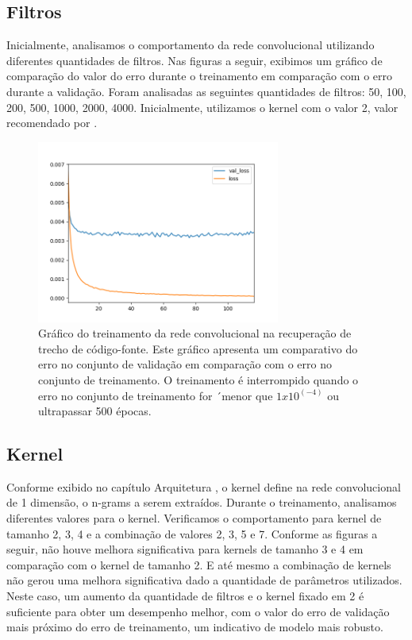 \subsection{Filtros}

Inicialmente, analisamos o comportamento da rede convolucional utilizando diferentes quantidades de filtros. Nas figuras a seguir, exibimos um gráfico de comparação do valor do erro durante o treinamento em comparação com o erro durante a validação. Foram analisadas as seguintes quantidades de filtros: 50, 100, 200, 500, 1000, 2000, 4000. Inicialmente, utilizamos o kernel com o valor 2, valor recomendado por \cite{tan-lstm-qa}.


\begin{figure}[h]
\includegraphics[width=8cm]{figuras/ape-ajustes-hiper-parametros/training-cnn-1000-k-2.png}
\caption{Gráfico do treinamento da rede convolucional na recuperação de trecho de código-fonte. Este gráfico apresenta um comparativo do erro no conjunto de validação em comparação com o erro no conjunto de treinamento. O treinamento é interrompido quando o erro no conjunto de treinamento for ´menor que $1x10^(-4)$ ou ultrapassar 500 épocas.}
\label{fig:ape-cnn-1000-k-2}
\end{figure}



\subsection{Kernel}

Conforme exibido no capítulo Arquitetura , o kernel define na rede convolucional de 1 dimensão, o n-grams a serem extraídos. Durante o treinamento, analisamos diferentes valores para o kernel. Verificamos o comportamento para kernel de tamanho 2, 3, 4 e a combinação de valores 2, 3, 5 e 7. Conforme as figuras a seguir, não houve melhora significativa para kernels de tamanho 3 e 4 em comparação com o kernel de tamanho 2. E até mesmo a combinação de kernels não gerou uma melhora significativa dado a quantidade de parâmetros utilizados. Neste caso, um aumento da quantidade de filtros e o kernel fixado em 2 é suficiente para obter um desempenho melhor, com o valor do erro de validação mais próximo do erro de treinamento, um indicativo de modelo mais robusto.






